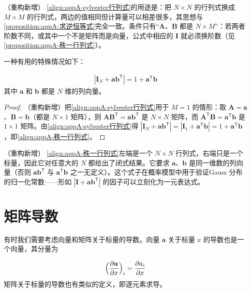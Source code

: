 \documentclass[../main.tex]{subfiles}
\begin{document}
\begin{remark}（重构新增）
\eqref{align:appA-sylvester行列式}的用途是：把 $N\times N$ 的行列式换成 $M\times M$ 的行列式，两边的值相同但计算量可以相差很多，其思想与\cref{proposition:appA-求逆恒等式}完全一致。条件只有“$\bm{A}$、$\bm{B}$ 都是 $N\times M$”：若两者阶数不同，或其中一个不是矩阵而是向量，公式中相应的 $\bm{I}$ 就必须换阶数（见\cref{proposition:appA-秩一行列式}）。
\end{remark}

一种有用的特殊情况如下：
\begin{proposition}[秩1 行列式恒等式]\label{proposition:appA-秩一行列式}
\begin{align}
  |\bm{I}_N+\bm{a}\bm{b}^{\mathsf{T}}|=1+\bm{a}^{\mathsf{T}}\bm{b}
  \label{align:appA-秩一行列式}
\end{align}
其中 $\bm{a}$ 和 $\bm{b}$ 都是 $N$ 维的列向量。
\end{proposition}

\begin{proof}
（重构新增）把\eqref{align:appA-sylvester行列式}用于 $M=1$ 的情形：取 $\bm{A}=\bm{a}$、$\bm{B}=\bm{b}$（都是 $N\times1$ 矩阵），则 $\bm{A}\bm{B}^{\mathsf{T}}=\bm{a}\bm{b}^{\mathsf{T}}$ 是 $N\times N$ 矩阵，而 $\bm{A}^{\mathsf{T}}\bm{B}=\bm{a}^{\mathsf{T}}\bm{b}$ 是 $1\times1$ 矩阵。由\eqref{align:appA-sylvester行列式}得 $|\bm{I}_N+\bm{a}\bm{b}^{\mathsf{T}}|=|\bm{I}_1+\bm{a}^{\mathsf{T}}\bm{b}|=1+\bm{a}^{\mathsf{T}}\bm{b}$，即\eqref{align:appA-秩一行列式}。
\end{proof}

\begin{remark}（重构新增）
\eqref{align:appA-秩一行列式}左端是一个 $N\times N$ 行列式，右端只是一个标量，因此它对任意大的 $N$ 都给出了闭式结果。它要求 $\bm{a}$、$\bm{b}$ 是同一维数的列向量（否则 $\bm{a}\bm{b}^{\mathsf{T}}$ 与 $\bm{a}^{\mathsf{T}}\bm{b}$ 之一无定义）。这个式子在概率模型中用于验证Gauss 分布的归一化常数——形如 $|\bm{I}+\bm{a}\bm{b}^{\mathsf{T}}|$ 的因子可以立刻化为一元表达式。
\end{remark}

\section{矩阵导数}\label{section:appA-矩阵导数}

有时我们需要考虑向量和矩阵关于标量的导数。向量 $\bm{a}$ 关于标量 $x$ 的导数也是一个向量，其分量为
\begin{definition}[向量与矩阵关于标量的导数]\label{definition:appA-标量导数}
\begin{align}
  \Bigl(\frac{\partial\bm{a}}{\partial x}\Bigr)_i=\frac{\partial a_i}{\partial x}
  \label{align:appA-向量导数}
\end{align}
矩阵关于标量的导数也有类似的定义，即逐元素求导。
\end{definition}
\end{document}
